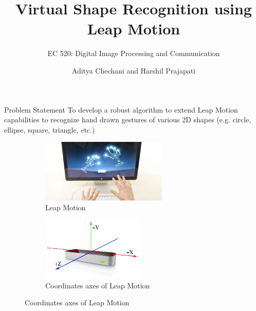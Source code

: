 \documentclass[10pt]{beamer}
\title{Virtual Shape Recognition using Leap Motion}
\subtitle{EC 520: Digital Image Processing and Communication}
\date{}
\author{Aditya Chechani and Harshil Prajapati}
\institute{Department of Electrical and Computer Engineering: Boston University}
\begin{document}
\maketitle

\begin{frame}[fragile]{Problem Statement}
  To develop a robust algorithm to extend Leap Motion capabilities to recognize hand drawn gestures of various 2D shapes (e.g. circle, ellipse, square, triangle, etc.)
  \begin{figure}
    \centering
    \begin{subfigure}[b]{0.35\textwidth}
        \includegraphics[width=\textwidth, height = 3cm]{leap}
        \caption{Leap Motion \cite{leap}}
    \end{subfigure}
    \begin{subfigure}[b]{0.5\textwidth}
        \includegraphics[width=\textwidth, height = 3cm]{Leap_Axes}
        \caption{Coordinates axes of Leap Motion }\label{fig:leapaxes}
    \end{subfigure}
\end{figure}
\end{frame}
\end{document}
